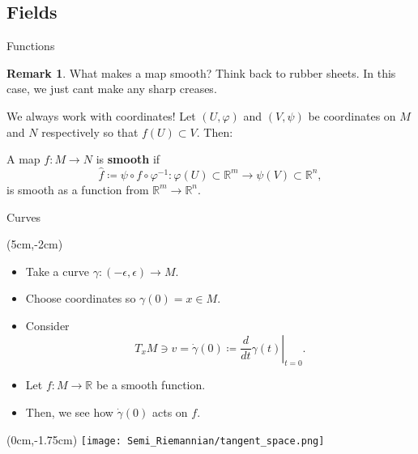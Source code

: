 \documentclass[usenames,dvipsnames]{beamer}
\theoremstyle{definition}
\newtheorem*{remark}{Remark}
\theoremstyle{theorem}
\newcommand{\R}{\mathbb{R}}
\begin{document}
    \subsection{Fields}
        \begin{frame}{Functions}
        \begin{remark}
            What makes a map smooth? Think back to rubber sheets. In this case, we just cant make any sharp creases.
        \end{remark}
        We always work with coordinates! Let $(U,\varphi)$ and $(V,\psi)$ be coordinates on $M$ and $N$ respectively so that $f(U)\subset V$. Then:
        \begin{definition}
            A map $f\colon M\to N$ is \textbf{smooth} if 
            \[
            \hat{f}\coloneqq \psi \circ f \circ \varphi^{-1} \colon \varphi(U)\subset \R^m \to \psi(V)\subset \R^n,
            \]
            is smooth as a function from $\R^m \to \R^n$.
        \end{definition}
        \end{frame}
    
        \begin{frame}{Curves}
            \begin{textblock*}{6cm}(5cm,-2cm)
            \begin{itemize}
                \item Take a curve $\gamma \colon (-\epsilon,\epsilon)\to M$.
                \item Choose coordinates so $\gamma(0)=x\in M$.
                \item Consider 
                \[
                T_xM\ni v= \dot{\gamma}(0)\coloneqq \left.\frac{d}{dt}\gamma(t)\right|_{t=0}.
                \]
                \item Let $f\colon M \to \R$ be a smooth function.
                \item Then, we see how $\dot{\gamma}(0)$ acts on $f$.
            \end{itemize}
            \end{textblock*}
            \begin{textblock*}{5cm}(0cm,-1.75cm)
            \texttt{[image: Semi\_Riemannian/tangent\_space.png]}
            \end{textblock*}
        \end{frame}
        
\end{document}
